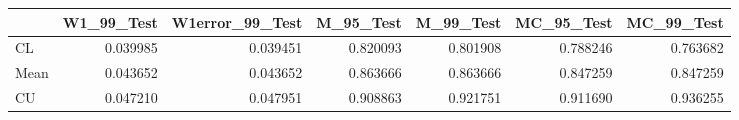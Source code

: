 \begin{tabular}{lrrrrrr}
\toprule
{} &  W1\_99\_Test &  W1error\_99\_Test &  M\_95\_Test &  M\_99\_Test &  MC\_95\_Test &  MC\_99\_Test \\
\midrule
CL   &    0.039985 &         0.039451 &   0.820093 &   0.801908 &    0.788246 &    0.763682 \\
Mean &    0.043652 &         0.043652 &   0.863666 &   0.863666 &    0.847259 &    0.847259 \\
CU   &    0.047210 &         0.047951 &   0.908863 &   0.921751 &    0.911690 &    0.936255 \\
\bottomrule
\end{tabular}
